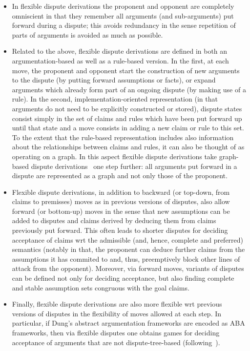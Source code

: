 \documentclass[conference]{IEEEtran}
\begin{document}
\begin{itemize}
\item In flexible dispute derivations the proponent and opponent are completely omniscient in that they remember all arguments (and sub-arguments) put forward during a dispute; this avoids redundancy in the sense repetition of parts of arguments is avoided as much as possible.    
\item Related to the above, flexible dispute derivations are defined in both an argumentation-based as well as a rule-based version.  In the first, at each move, the proponent and opponent start the construction of new arguments to the dispute (by putting forward assumptions or facts), or expand arguments which already form part of an ongoing dispute (by making use of a rule).  In the second, implementation-oriented representation (in that arguments do not need to be explicitly constructed or stored), dispute states consist simply in the set of claims and rules which have been put forward up until that state and a move consists in adding a new claim or rule to this set.   To the extent that the rule-based representation includes also information about the relationships between claims and rules, it can also be thought of as operating on a graph.  In this aspect flexible dispute derivations take graph-based dispute derivations~\cite{CravenT16} one step further: all arguments put forward in a dispute are represented as a graph and not only those of the proponent.
\item Flexible dispute derivations, in addition to backward (or top-down, from claims to premisses) moves as in previous versions of disputes, also allow forward (or bottom-up) moves in the sense that new assumptions can be added to disputes and claims derived by deducing them from claims previously put forward.  This often leads to shorter disputes for deciding acceptance of claims wrt the admissible (and, hence, complete and preferred) semantics (notably in that, the proponent can deduce further claims from the assumptions it has commited to and, thus, preemptively block other lines of attack from the opponent). Moreover, via forward moves, variants of disputes can be defined not only for deciding acceptance, but also finding complete and stable assumption sets congruous with the goal claims.
\item Finally, flexible dispute derivations are also more flexible wrt previous versions of disputes in the flexibility of moves allowed at each step.  In particular, if Dung's abstract argumentation frameworks are encoded as ABA frameworks, then via flexible disputes one obtains games for deciding acceptance of arguments that are not dispute-tree-based (following~\cite{Caminada18}).
\end{itemize}
\end{document}
